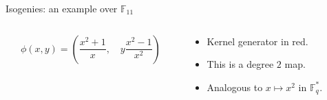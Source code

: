 \documentclass[aspectratio=169]{beamer}
\newcommand{\F}{\mathbb{F}}
\begin{document}
\begin{frame}{Isogenies: an example over $\F_{11}$}
  \begin{columns}
    \begin{column}{0.5\textwidth}
      \[\phi(x,y) = \left(\frac{x^2 + 1}{x},\quad y\frac{x^2-1}{x^2}\right)\]
    \end{column}
    \begin{column}{0.5\textwidth}
      \begin{itemize}
      \item<2-> Kernel generator in \alert{red}.
      \item<2-> This is a degree $2$ map.
      \item<2-> Analogous to $x\mapsto x^2$ in $\F_q^*$.
      \end{itemize}
    \end{column}
  \end{columns}
\end{frame}

\end{document}
